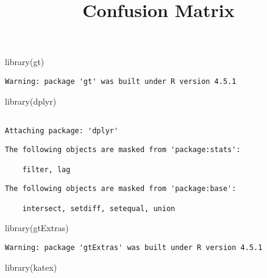 \documentclass[
  10pt,
  letterpaper,
  DIV=11,
  numbers=noendperiod]{scrartcl}
\title{Confusion Matrix}
\author{}
\date{}
\newenvironment{Shaded}{\begin{snugshade}}{\end{snugshade}}
\newcommand{\FunctionTok}[1]{\textcolor[rgb]{0.28,0.35,0.67}{#1}}
\newcommand{\NormalTok}[1]{\textcolor[rgb]{0.00,0.23,0.31}{#1}}
\begin{document}
\maketitle


\begin{Shaded}
\begin{Highlighting}[]
\FunctionTok{library}\NormalTok{(gt)}
\end{Highlighting}
\end{Shaded}

\begin{verbatim}
Warning: package 'gt' was built under R version 4.5.1
\end{verbatim}

\begin{Shaded}
\begin{Highlighting}[]
\FunctionTok{library}\NormalTok{(dplyr)}
\end{Highlighting}
\end{Shaded}

\begin{verbatim}

Attaching package: 'dplyr'
\end{verbatim}

\begin{verbatim}
The following objects are masked from 'package:stats':

    filter, lag
\end{verbatim}

\begin{verbatim}
The following objects are masked from 'package:base':

    intersect, setdiff, setequal, union
\end{verbatim}

\begin{Shaded}
\begin{Highlighting}[]
\FunctionTok{library}\NormalTok{(gtExtras)}
\end{Highlighting}
\end{Shaded}

\begin{verbatim}
Warning: package 'gtExtras' was built under R version 4.5.1
\end{verbatim}

\begin{Shaded}
\begin{Highlighting}[]
\FunctionTok{library}\NormalTok{(katex)}
\end{Highlighting}
\end{Shaded}
\end{document}
